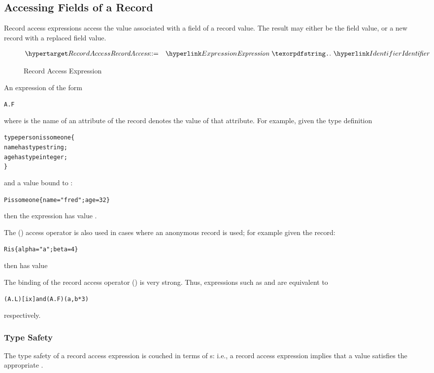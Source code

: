 \subsection{Accessing Fields of a Record}
\label{dotAccess}

Record access expressions access the value associated with a field of a record value. The result may either be the field value, or a new record with a replaced field value.

\begin{figure}[htbp]
\begin{eqnarray*}
\ntDef{RecordAccess}&\arrow&\ntRef{Expression}\ \q{.}\ \ntRef{Identifier}
\end{eqnarray*}
\caption{Record Access Expression}\label{recordAccessFig}
\end{figure}

An expression of the form
\begin{alltt}
A.F
\end{alltt}
where  is the name of an attribute of the record  denotes the value of that attribute. For example, given the type definition
\begin{alltt}
type person is someone\{
  name has type string;
  age has type integer;
\}
\end{alltt}
and a  value bound to :
\begin{alltt}
P is someone\{ name="fred"; age=32 \}
\end{alltt}
then the expression  has value .

The () access operator is also used in cases where an anonymous record is used; for example given the record:
\begin{alltt}
R is \{ alpha = "a"; beta=4\}
\end{alltt}
then  has value 
\begin{aside}
The binding of the record access operator () is very strong. Thus, expressions such as 
 and 
are equivalent to
\begin{alltt}
(A.L)[ix] {\rm and} (A.F)(a,b*3)
\end{alltt}
respectively.
\end{aside}

\subsubsection{Type Safety}
The type safety of a record access expression is couched in terms of s: i.e., a record access expression implies that a value satisfies the appropriate .

